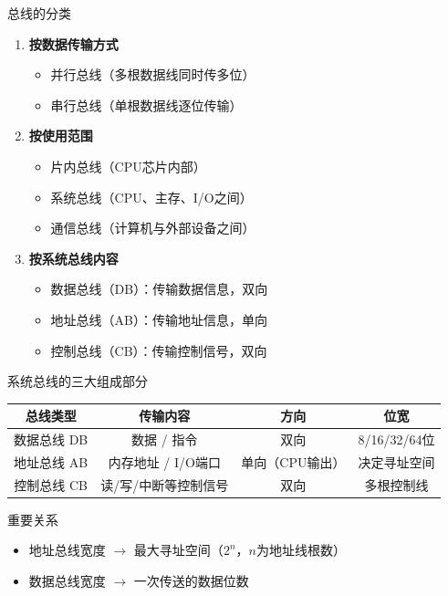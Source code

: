 \documentclass[10pt, aspectratio=169]{beamer}
\begin{document}
\begin{frame}{总线的分类}
    \begin{enumerate}
        \item \textbf{按数据传输方式}
            \begin{itemize}
                \item 并行总线（多根数据线同时传多位）
                \item 串行总线（单根数据线逐位传输）
            \end{itemize}
        \item \textbf{按使用范围}
            \begin{itemize}
                \item 片内总线（CPU芯片内部）
                \item 系统总线（CPU、主存、I/O之间）
                \item 通信总线（计算机与外部设备之间）
            \end{itemize}
        \item \textbf{按系统总线内容}
            \begin{itemize}
                \item 数据总线（DB）：传输数据信息，双向
                \item 地址总线（AB）：传输地址信息，单向
                \item 控制总线（CB）：传输控制信号，双向
            \end{itemize}
    \end{enumerate}
\end{frame}

\begin{frame}{系统总线的三大组成部分}
    \begin{center}
        \begin{tabular}{|c|c|c|c|}
            \hline
            \textbf{总线类型} & \textbf{传输内容} & \textbf{方向} & \textbf{位宽} \\
            \hline
            数据总线 DB & 数据 / 指令 & 双向 & 8/16/32/64位 \\
            地址总线 AB & 内存地址 / I/O端口 & 单向（CPU输出） & 决定寻址空间 \\
            控制总线 CB & 读/写/中断等控制信号 & 双向 & 多根控制线 \\
            \hline
        \end{tabular}
    \end{center}
    \vspace{0.5em}
    \begin{block}{重要关系}
        \begin{itemize}
            \item 地址总线宽度 $\rightarrow$ 最大寻址空间（$2^n$，$n$为地址线根数）
            \item 数据总线宽度 $\rightarrow$ 一次传送的数据位数
        \end{itemize}
    \end{block}
\end{frame}
\end{document}
